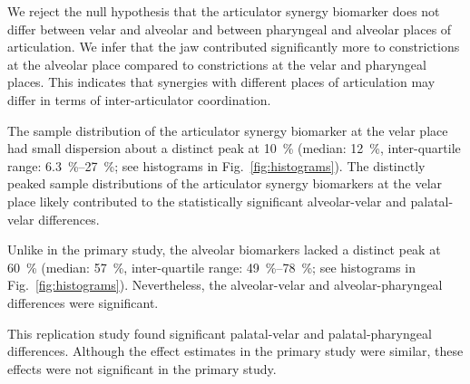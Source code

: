 \documentclass[reprint]{JASAnew}\usepackage[]{graphicx}\usepackage[]{color}
\begin{document}
We reject the null hypothesis that the articulator synergy biomarker does not differ between velar and alveolar and between pharyngeal and alveolar places of articulation. 
%
We infer that the jaw contributed significantly more to constrictions at the alveolar place compared to constrictions at the velar and pharyngeal places.
%
This indicates that synergies with different places of articulation may differ in terms of inter-articulator coordination.




The sample distribution of the articulator synergy biomarker at the velar place had small dispersion about a distinct peak at \SI{10}{\percent} 
%
(median: \SI{12}{\percent}, 
inter-quartile range: \SIrange{6.3}{27}{\percent}; see histograms in Fig.~\ref{fig:histograms}).
%
The distinctly peaked sample distributions of the articulator synergy biomarkers at the velar place likely contributed to the statistically significant alveolar-velar and palatal-velar differences.

Unlike in the primary study, the alveolar biomarkers lacked a distinct peak at \SI{60}{\percent}
%
(median: \SI{57}{\percent}, 
inter-quartile range: \SIrange{49}{78}{\percent}; see histograms in Fig.~\ref{fig:histograms}).
%
Nevertheless, the alveolar-velar and alveolar-pharyngeal differences were significant.

This replication study found significant palatal-velar and palatal-pharyngeal differences. Although the effect estimates in the primary study were similar, these effects were not significant in the primary study. 







\end{document}
